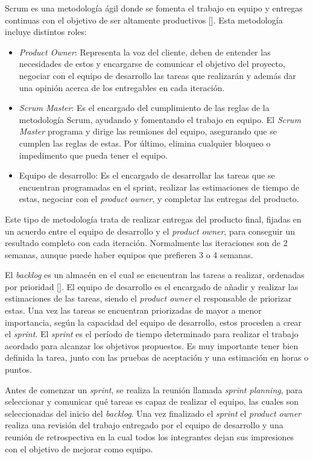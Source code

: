 Scrum es una metodología ágil donde se fomenta el trabajo en equipo y entregas continuas con el objetivo de ser altamente productivos [\cite{92}]. Esta metodología incluye distintos roles:
\begin{itemize}
	\item \textit{Product Owner}: Representa la voz del cliente, deben de entender las necesidades de estos y encargarse de comunicar el objetivo del proyecto, negociar con el equipo de desarrollo las tareas que realizarán y además dar una opinión acerca de los entregables en cada iteración.
	\item \textit{Scrum Master}: Es el encargado del cumplimiento de las reglas de la metodología Scrum, ayudando y fomentando el trabajo en equipo. El \textit{Scrum Master} programa y dirige las reuniones del equipo, asegurando que se cumplen las reglas de estas. Por último, elimina cualquier bloqueo o impedimento que pueda tener el equipo.
	\item Equipo de desarrollo: Es el encargado de desarrollar las tareas que se encuentran programadas en el sprint, realizar las estimaciones de tiempo de estas, negociar con el \textit{product owner}, y completar las entregas del producto.
\end{itemize}

Este tipo de metodología trata de realizar entregas del producto final, fijadas en un acuerdo entre el equipo de desarrollo y el \textit{product owner}, para conseguir un resultado completo con cada iteración. Normalmente las iteraciones son de 2 semanas, aunque puede haber equipos que prefieren 3 o 4 semanas.

El \textit{backlog} es un almacén en el cual se encuentran las tareas a realizar, ordenadas por prioridad [\cite{93}]. El equipo de desarrollo es el encargado de añadir y realizar las estimaciones de las tareas, siendo el \textit{product owner} el responsable de priorizar estas. Una vez las tareas se encuentran priorizadas de mayor a menor importancia, según la capacidad del equipo de desarrollo, estos proceden a crear el \textit{sprint}. El \textit{sprint} es el período de tiempo determinado para realizar el trabajo acordado para alcanzar los objetivos propuestos. Es muy importante tener bien definida la tarea, junto con las pruebas de aceptación y una estimación en horas o puntos.

Antes de comenzar un \textit{sprint}, se realiza la reunión llamada \textit{sprint planning}, para seleccionar y comunicar qué tareas es capaz de realizar el equipo, las cuales son seleccionadas del inicio del \textit{backlog}. Una vez finalizado el \textit{sprint} el \textit{product owner} realiza una revisión del trabajo entregado por el equipo de desarrollo y una reunión de retrospectiva en la cual todos los integrantes dejan sus impresiones con el objetivo de mejorar como equipo.

